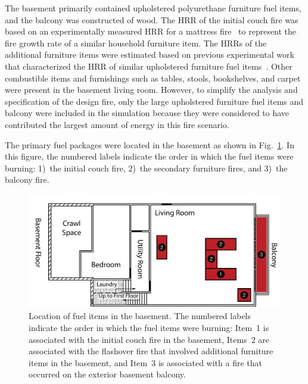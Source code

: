 \documentclass[12pt,oneside]{book}
\begin{document}
The basement primarily contained upholstered polyurethane furniture fuel items, and the balcony was constructed of wood. The HRR of the initial couch fire was based on an experimentally measured HRR for a mattress fire~\cite{madrzykowski2009fire} to represent the fire growth rate of a similar household furniture item. The HRRs of the additional furniture items were estimated based on previous experimental work that characterized the HRR of similar upholstered furniture fuel items~\cite{madrzykowski2009fire,Madrzykowski:2,Babrauskas:1}. Other combustible items and furnishings such as tables, stools, bookshelves, and carpet were present in the basement living room. However, to simplify the analysis and specification of the design fire, only the large upholstered furniture fuel items and balcony were included in the simulation because they were considered to have contributed the largest amount of energy in this fire scenario.

The primary fuel packages were located in the basement as shown in Fig.~\ref{fig:fuel_placement}. In this figure, the numbered labels indicate the order in which the fuel items were burning: 1)~the initial couch fire, 2)~the secondary furniture fires, and 3)~the balcony fire.

\begin{figure}[!ht]
\includegraphics[width=5.5in]{../Figures/Plan_Basement_Fuels}
\caption[Location of fuel items in the basement.]
{Location of fuel items in the basement. The numbered labels indicate the order in which the fuel items were burning: Item~1 is associated with the initial couch fire in the basement, Items~2 are associated with the flashover fire that involved additional furniture items in the basement, and Item~3 is associated with a fire that occurred on the exterior basement balcony.}
\label{fig:fuel_placement}
\end{figure}


\clearpage
\end{document}
